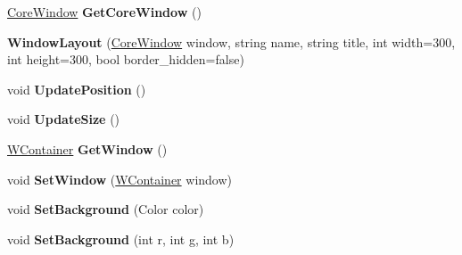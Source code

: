 \begin{DoxyCompactItemize}
\item 
\mbox{\label{class_space_v_i_l_1_1_window_layout_af6094d36d89d5f4a50281cc3e5bd934d}} 
\mbox{\hyperlink{class_space_v_i_l_1_1_core_window}{Core\+Window}} {\bfseries Get\+Core\+Window} ()
\item 
\mbox{\label{class_space_v_i_l_1_1_window_layout_aaeffcab6b43619e1899f6310cc838010}} 
{\bfseries Window\+Layout} (\mbox{\hyperlink{class_space_v_i_l_1_1_core_window}{Core\+Window}} window, string name, string title, int width=300, int height=300, bool border\+\_\+hidden=false)
\item 
\mbox{\label{class_space_v_i_l_1_1_window_layout_a637fc8c9d1b5a3af28eaf7422cafcd6e}} 
void {\bfseries Update\+Position} ()
\item 
\mbox{\label{class_space_v_i_l_1_1_window_layout_af13e1e0544bcaefaaeaa123fd9dc0b52}} 
void {\bfseries Update\+Size} ()
\item 
\mbox{\label{class_space_v_i_l_1_1_window_layout_a39c5056a441bf4c532753a3cec4ad082}} 
\mbox{\hyperlink{class_space_v_i_l_1_1_w_container}{W\+Container}} {\bfseries Get\+Window} ()
\item 
\mbox{\label{class_space_v_i_l_1_1_window_layout_afcbdf9b8a212d3eeddfd3243e3d4b3a8}} 
void {\bfseries Set\+Window} (\mbox{\hyperlink{class_space_v_i_l_1_1_w_container}{W\+Container}} window)
\item 
\mbox{\label{class_space_v_i_l_1_1_window_layout_a6bc39ce349b7a492b57b785647c9b6d7}} 
void {\bfseries Set\+Background} (Color color)
\item 
\mbox{\label{class_space_v_i_l_1_1_window_layout_a14ad68ce6ef1034e7e1844c2daaf0afa}} 
void {\bfseries Set\+Background} (int r, int g, int b)
\item 
\mbox{\label{class_space_v_i_l_1_1_window_layout_af89bbb3b46585a8e8f1468ab0421ab2e}} 

\end{DoxyCompactItemize}
